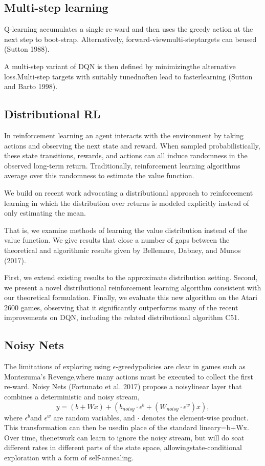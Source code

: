 \documentclass{article}
\begin{document}
\subsection{Multi-step learning}
\quad Q-learning accumulates a single re-ward and then uses the greedy action at the next step to boot-strap. Alternatively, forward-viewmulti-steptargets can beused (Sutton 1988).

A multi-step variant of DQN is then defined by minimizingthe alternative loss.Multi-step targets with suitably tunednoften lead to fasterlearning (Sutton and Barto 1998).

\subsection{Distributional RL}
\quad In reinforcement learning an agent interacts with the environment by taking actions and observing the next state and reward. When sampled probabilistically, these state transitions, rewards, and actions can all induce randomness in the observed long-term return. Traditionally, reinforcement learning algorithms average over this randomness to estimate the value function.
    
    We build on recent work advocating a distributional approach to reinforcement learning in which the distribution over returns is modeled explicitly instead of only estimating the mean.
    
    That is, we examine methods of learning the value distribution instead of the value function. We give results that close a number of gaps between the theoretical and algorithmic results given by Bellemare, Dabney, and Munos (2017).
    
    First, we extend existing results to the approximate distribution setting.
    Second, we present a novel distributional reinforcement learning algorithm consistent with our theoretical formulation.
    Finally, we evaluate this new algorithm on the Atari 2600 games, observing that it significantly outperforms many of the recent improvements on DQN, including the related distributional algorithm C51. 

\subsection{Noisy Nets}
\quad The  limitations  of  exploring  using $\epsilon$-greedypolicies are clear in games such as Montezuma’s Revenge,where many actions must be executed to collect the first re-ward.  Noisy  Nets  (Fortunato  et  al.  2017)  propose  a  noisylinear layer that combines a deterministic and noisy stream,$$y =  (b + Wx) + (b_{noisy} \cdot \epsilon^b + (W_{noisy} \cdot \epsilon^w)x),$$ where $\epsilon^b$and $\epsilon^w$ are random variables, and $\cdot$ denotes the element-wise product. This transformation can then be usedin place of the standard lineary=b+Wx. Over time, thenetwork can learn to ignore the noisy stream, but will do soat different rates in different parts of the state space, allowingstate-conditional exploration with a form of self-annealing.
\end{document}
